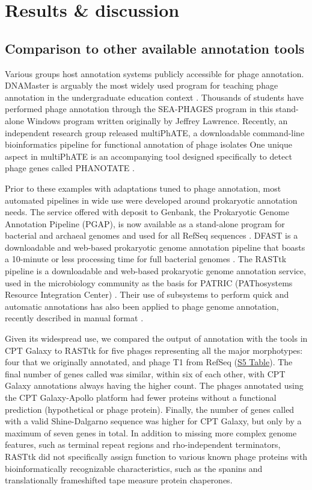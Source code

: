 \section*{Results \& discussion}

\subsection*{Comparison to other available annotation tools}

Various groups host annotation systems publicly accessible for phage
annotation. DNAMaster is arguably the most widely used program for
teaching phage annotation in the undergraduate education context
\cite{Jordan_2014}. Thousands of students have performed phage annotation through
the SEA-PHAGES program in this stand-alone Windows program written
originally by Jeffrey Lawrence. Recently, an independent research group
released multiPhATE, a downloadable command-line bioinformatics pipeline
for functional annotation of phage isolates \cite{Ecale_Zhou_2019} One unique aspect in
multiPhATE is an accompanying tool designed specifically to detect phage
genes called PHANOTATE \cite{McNair_2019}.

Prior to these examples with adaptations tuned to phage annotation, most
automated pipelines in wide use were developed around prokaryotic
annotation needs. The service offered with deposit to Genbank, the
Prokaryotic Genome Annotation Pipeline (PGAP), is now available as a
stand-alone program for bacterial and archaeal genomes and used for all
RefSeq sequences \cite{Tatusova_2016,Haft_2017}. DFAST is a downloadable and web-based
prokaryotic genome annotation pipeline that boasts a 10-minute or less
processing time for full bacterial genomes \cite{Tanizawa_2017}. The RASTtk pipeline
is a downloadable and web-based prokaryotic genome annotation service,
used in the microbiology community as the basis for PATRIC (PAThosystems
Resource Integration Center) \cite{Aziz_2008,Overbeek_2013}. Their use of subsystems to
perform quick and automatic annotations has also been applied to phage
genome annotation, recently described in manual format \cite{McNair_2017}.

Given its widespread use, we compared the output of annotation with the
tools in CPT Galaxy to RASTtk for five phages representing all the major
morphotypes: four that we originally annotated, and phage T1 from RefSeq
(\protect\hyperlink{pcbi.1008214.s005}{S5 Table}). The final number of
genes called was similar, within six of each other, with CPT Galaxy
annotations always having the higher count. The phages annotated using
the CPT Galaxy-Apollo platform had fewer proteins without a functional
prediction (hypothetical or phage protein). Finally, the number of genes
called with a valid Shine-Dalgarno sequence was higher for CPT Galaxy,
but only by a maximum of seven genes in total. In addition to missing
more complex genome features, such as terminal repeat regions and
rho-independent terminators, RASTtk did not specifically assign function
to various known phage proteins with bioinformatically recognizable
characteristics, such as the spanins and translationally frameshifted
tape measure protein chaperones.

